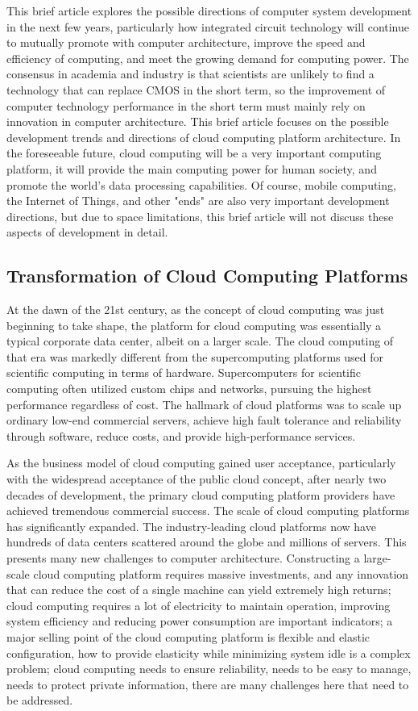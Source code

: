 This brief article explores the possible directions of computer system development in the next few years, particularly how integrated circuit technology will continue to mutually promote with computer architecture, improve the speed and efficiency of computing, and meet the growing demand for computing power. The consensus in academia and industry is that scientists are unlikely to find a technology that can replace CMOS in the short term, so the improvement of computer technology performance in the short term must mainly rely on innovation in computer architecture. This brief article focuses on the possible development trends and directions of cloud computing platform architecture. In the foreseeable future, cloud computing will be a very important computing platform, it will provide the main computing power for human society, and promote the world's data processing capabilities. Of course, mobile computing, the Internet of Things, and other "ends" are also very important development directions, but due to space limitations, this brief article will not discuss these aspects of development in detail.

\subsection{Transformation of Cloud Computing Platforms}

At the dawn of the 21st century, as the concept of cloud computing was just beginning to take shape, the platform for cloud computing was essentially a typical corporate data center, albeit on a larger scale. The cloud computing of that era was markedly different from the supercomputing platforms used for scientific computing in terms of hardware. Supercomputers for scientific computing often utilized custom chips and networks, pursuing the highest performance regardless of cost. The hallmark of cloud platforms was to scale up ordinary low-end commercial servers, achieve high fault tolerance and reliability through software, reduce costs, and provide high-performance services.

As the business model of cloud computing gained user acceptance, particularly with the widespread acceptance of the public cloud concept, after nearly two decades of development, the primary cloud computing platform providers have achieved tremendous commercial success. The scale of cloud computing platforms has significantly expanded. The industry-leading cloud platforms now have hundreds of data centers scattered around the globe and millions of servers. This presents many new challenges to computer architecture. Constructing a large-scale cloud computing platform requires massive investments, and any innovation that can reduce the cost of a single machine can yield extremely high returns; cloud computing requires a lot of electricity to maintain operation, improving system efficiency and reducing power consumption are important indicators; a major selling point of the cloud computing platform is flexible and elastic configuration, how to provide elasticity while minimizing system idle is a complex problem; cloud computing needs to ensure reliability, needs to be easy to manage, needs to protect private information, there are many challenges here that need to be addressed.

